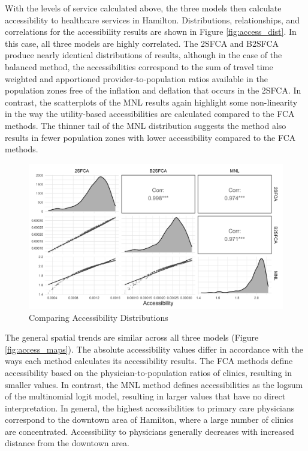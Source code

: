 \documentclass[]{elsarticle} %
\begin{document}
With the levels of service calculated above, the three models then
calculate accessibility to healthcare services in Hamilton.
Distributions, relationships, and correlations for the accessibility
results are shown in Figure \ref{fig:access_dist}. In this case, all
three models are highly correlated. The 2SFCA and B2SFCA produce nearly
identical distributions of results, although in the case of the balanced
method, the accessibilities correspond to the sum of travel time
weighted and apportioned provider-to-population ratios available in the
population zones free of the inflation and deflation that occurs in the
2SFCA. In contrast, the scatterplots of the MNL results again highlight
some non-linearity in the way the utility-based accessibilities are
calculated compared to the FCA methods. The thinner tail of the MNL
distribution suggests the method also results in fewer population zones
with lower accessibility compared to the FCA methods.

\begin{figure}
\includegraphics[width=1\linewidth]{./img/pair_plot_access} \caption{\label{fig:access_dist}Comparing Accessibility Distributions}\label{fig:access_dist_fig}
\end{figure}

The general spatial trends are similar across all three models (Figure
\ref{fig:access_maps}). The absolute accessibility values differ in
accordance with the ways each method calculates its accessibility
results. The FCA methods define accessibility based on the
physician-to-population ratios of clinics, resulting in smaller values.
In contrast, the MNL method defines accessibilities as the logsum of the
multinomial logit model, resulting in larger values that have no direct
interpretation. In general, the highest accessibilities to primary care
physicians correspond to the downtown area of Hamilton, where a large
number of clinics are concentrated. Accessibility to physicians
generally decreases with increased distance from the downtown area.
\end{document}
